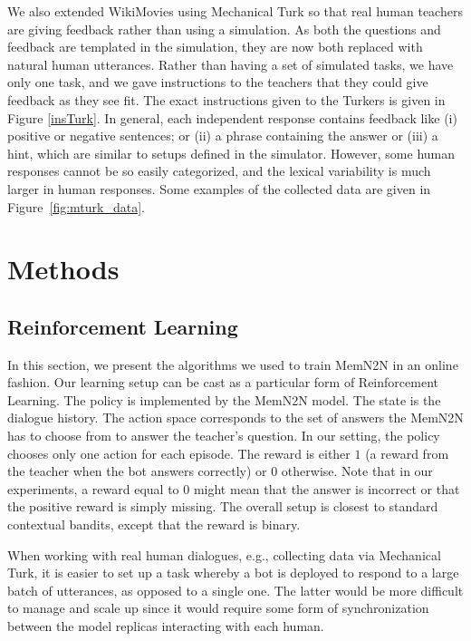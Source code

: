 We also extended WikiMovies using Mechanical
Turk so that real human teachers are  giving feedback rather than using a simulation.
As both the questions and feedback are templated in the simulation, they are now both
replaced with natural human utterances. Rather than having a set of simulated tasks, we have
only one task, and we gave instructions to the teachers that they could give feedback
as they see fit. The exact instructions given to the Turkers is given in Figure \ref{insTurk}.
In general, each independent response  contains feedback like
(i) positive or negative sentences; or (ii) a phrase containing the answer
or (iii) a hint,  which are similar to setups defined in the simulator. However,
 some human responses cannot be so easily categorized,
and the lexical variability is much larger in human responses.
Some examples of the collected data are given in Figure~\ref{fig:mturk_data}.


\section{Methods}
\subsection{Reinforcement Learning} \label{sec:rl} %
In this section, we present the algorithms we used to train MemN2N in an online fashion.
Our learning setup can be cast as a particular form of Reinforcement Learning. 
The policy is implemented by the MemN2N model. 
The state is the dialogue history. %
The action space
corresponds to the set of answers the MemN2N has to choose from to answer the teacher's
 question. In our setting, the policy chooses only one action for each episode.
The reward is either $1$ (a reward from the teacher when the bot answers correctly) 
 or $0$ otherwise.
Note that in our experiments, a reward equal to $0$ might mean that the answer is incorrect or
that the positive reward is simply missing.
The overall setup is closest to standard contextual bandits, except that the reward is binary.


When working with real human dialogues, e.g., collecting data via Mechanical Turk,
it is easier to set up a task whereby a bot is deployed to respond to a large batch of utterances,
as opposed to a single one.
The latter would be more difficult to manage and scale up since it would require some
form of synchronization between the model replicas interacting with each human.

